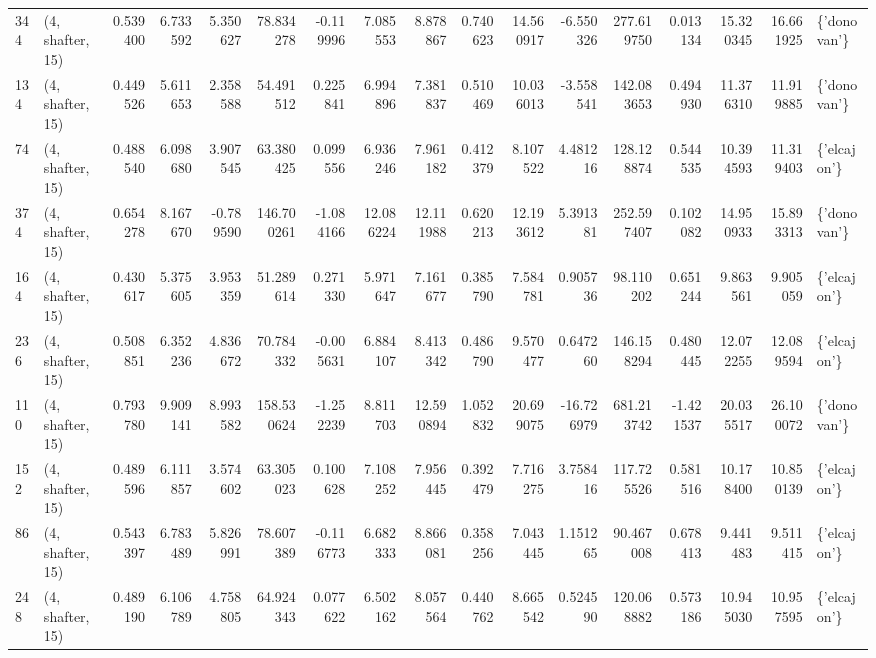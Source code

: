 \begin{tabular}{llrrrrrrrrrrrrrrl}
344 &  (4, shafter, 15) &   0.539400 &   6.733592 &   5.350627 &    78.834278 &  -0.119996 &   7.085553 &   8.878867 &  0.740623 &  14.560917 &  -6.550326 &   277.619750 &   0.013134 &  15.320345 &  16.661925 &  \{'donovan'\} \\
134 &  (4, shafter, 15) &   0.449526 &   5.611653 &   2.358588 &    54.491512 &   0.225841 &   6.994896 &   7.381837 &  0.510469 &  10.036013 &  -3.558541 &   142.083653 &   0.494930 &  11.376310 &  11.919885 &  \{'donovan'\} \\
74  &  (4, shafter, 15) &   0.488540 &   6.098680 &   3.907545 &    63.380425 &   0.099556 &   6.936246 &   7.961182 &  0.412379 &   8.107522 &   4.481216 &   128.128874 &   0.544535 &  10.394593 &  11.319403 &  \{'elcajon'\} \\
374 &  (4, shafter, 15) &   0.654278 &   8.167670 &  -0.789590 &   146.700261 &  -1.084166 &  12.086224 &  12.111988 &  0.620213 &  12.193612 &   5.391381 &   252.597407 &   0.102082 &  14.950933 &  15.893313 &  \{'donovan'\} \\
164 &  (4, shafter, 15) &   0.430617 &   5.375605 &   3.953359 &    51.289614 &   0.271330 &   5.971647 &   7.161677 &  0.385790 &   7.584781 &   0.905736 &    98.110202 &   0.651244 &   9.863561 &   9.905059 &  \{'elcajon'\} \\
236 &  (4, shafter, 15) &   0.508851 &   6.352236 &   4.836672 &    70.784332 &  -0.005631 &   6.884107 &   8.413342 &  0.486790 &   9.570477 &   0.647260 &   146.158294 &   0.480445 &  12.072255 &  12.089594 &  \{'elcajon'\} \\
110 &  (4, shafter, 15) &   0.793780 &   9.909141 &   8.993582 &   158.530624 &  -1.252239 &   8.811703 &  12.590894 &  1.052832 &  20.699075 & -16.726979 &   681.213742 &  -1.421537 &  20.035517 &  26.100072 &  \{'donovan'\} \\
152 &  (4, shafter, 15) &   0.489596 &   6.111857 &   3.574602 &    63.305023 &   0.100628 &   7.108252 &   7.956445 &  0.392479 &   7.716275 &   3.758416 &   117.725526 &   0.581516 &  10.178400 &  10.850139 &  \{'elcajon'\} \\
86  &  (4, shafter, 15) &   0.543397 &   6.783489 &   5.826991 &    78.607389 &  -0.116773 &   6.682333 &   8.866081 &  0.358256 &   7.043445 &   1.151265 &    90.467008 &   0.678413 &   9.441483 &   9.511415 &  \{'elcajon'\} \\
248 &  (4, shafter, 15) &   0.489190 &   6.106789 &   4.758805 &    64.924343 &   0.077622 &   6.502162 &   8.057564 &  0.440762 &   8.665542 &   0.524590 &   120.068882 &   0.573186 &  10.945030 &  10.957595 &  \{'elcajon'\} \\

\end{tabular}
